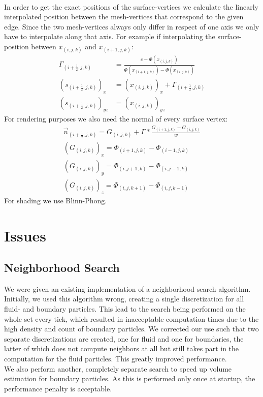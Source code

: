 \documentclass{ACGSeminar}
\begin{document}
\\
In order to get the exact positions of the surface-vertices we calculate the linearly interpolated position between the mesh-vertices that correspond to the given edge. Since the two mesh-vertices always only differ in respect of one axis we only have to interpolate along that axis. For example if interpolating the surface-position between \(x_{(i,j,k)}\) and \(x_{(i+1,j,k)}\):
\begin{equation} \label{eq:implicit_surface}
\begin{aligned}
\Gamma_{(i+\frac{1}{2},j,k)} &= \frac{c - \Phi(x_{(i,j,k)})}{\Phi(x_{(i+1,j,k)}) -\Phi(x_{(i,j,k)})} \\
(s_{(i+\frac{1}{2},j,k)})_x &= (x_{(i,j,k)})_x + \Gamma_{(i+\frac{1}{2},j,k)} \\
(s_{(i+\frac{1}{2},j,k)})_{yz} &= (x_{(i,j,k)})_{yz}
\end{aligned} 
\end{equation}
For rendering purposes we also need the normal of every surface vertex:
\begin{equation} \label{eq:implicit_surface}
\begin{aligned}
\vec{n}_{(i+\frac{1}{2},j,k)} = G_{(i,j,k)} + \Gamma * \frac{G_{(i+1,j,k)}-G_{(i,j,k)}}{w}
\\
(G_{(i,j,k)})_x = \Phi_{(i+1,j,k)} - \Phi_{(i-1,j,k)} \\
(G_{(i,j,k)})_y = \Phi_{(i,j+1,k)} - \Phi_{(i,j-1,k)} \\
(G_{(i,j,k)})_z = \Phi_{(i,j,k+1)} - \Phi_{(i,j,k-1)}
\end{aligned} 
\end{equation}
For shading we use Blinn-Phong.

\section{Issues}
\subsection{Neighborhood Search}
We were given an existing implementation of a neighborhood search algorithm. Initially, we used this algorithm wrong, creating a single discretization for all fluid- and boundary particles. This lead to the search being performed on the whole set every tick, which resulted in inacceptable computation times due to the high density and count of boundary particles. We corrected our use such that two separate discretizations are created, one for fluid and one for boundaries, the latter of which does not compute neighbors at all but still takes part in the computation for the fluid particles. This greatly improved performance.\\
We also perform another, completely separate search to speed up volume estimation for boundary particles. As this is performed only once at startup, the performance penalty is acceptable.
\end{document}
